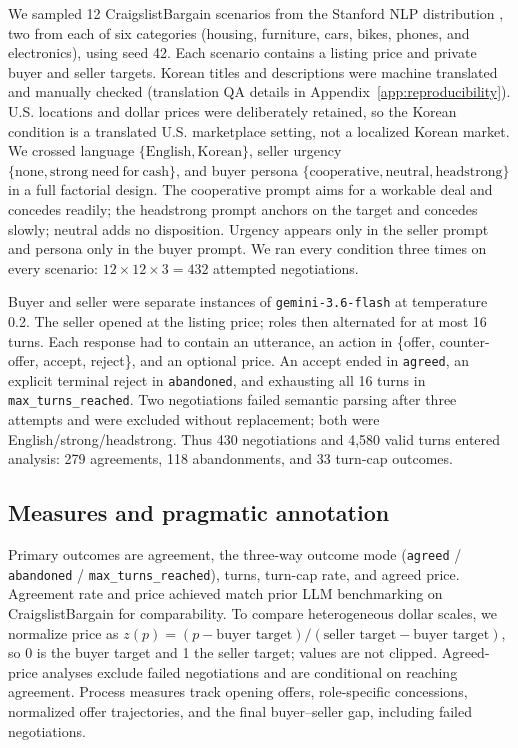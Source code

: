 \documentclass{article}
\begin{document}
We sampled 12 CraigslistBargain scenarios from the Stanford NLP distribution
\citep{he2018decoupling,stanfordnlp2026craigslist}, two from each of six
categories (housing, furniture, cars, bikes, phones, and electronics), using
seed 42. Each scenario contains a listing price and private buyer and seller
targets. Korean titles and descriptions were machine translated and manually checked
(translation QA details in Appendix~\ref{app:reproducibility}). U.S. locations and dollar prices were
deliberately retained, so the Korean condition is a translated U.S.
marketplace setting, not a localized Korean market.
We crossed language $\{\mathrm{English},\mathrm{Korean}\}$,
seller urgency $\{\mathrm{none},\mathrm{strong\ need\ for\ cash}\}$, and buyer
persona $\{\mathrm{cooperative},\mathrm{neutral},\mathrm{headstrong}\}$ in a
full factorial design. The cooperative prompt aims for a workable deal and
concedes readily; the headstrong prompt anchors on the target and concedes
slowly; neutral adds no disposition. Urgency appears only in the seller
prompt and persona only in the buyer prompt. We ran every condition three
times on every scenario: $12\times 12\times 3=432$ attempted negotiations.

Buyer and seller were separate instances of \texttt{gemini-3.6-flash} at temperature 0.2. The seller opened at the listing price;
roles then alternated for at most 16 turns. Each response had to contain an
utterance, an action in \{offer, counter-offer, accept, reject\}, and an
optional price. An accept ended in \texttt{agreed}, an explicit terminal
reject in \texttt{abandoned}, and exhausting all 16 turns in
\texttt{max\_turns\_reached}. Two negotiations failed semantic parsing after three attempts and were
excluded without replacement; both were English/strong/headstrong. Thus 430 negotiations and 4,580 valid turns entered analysis:
279 agreements, 118 abandonments, and 33 turn-cap outcomes.

\subsection{Measures and pragmatic annotation}

Primary outcomes are agreement, the three-way outcome mode
(\texttt{agreed} /  \texttt{abandoned} /  \texttt{max\_turns\_reached}), turns,
turn-cap rate, and agreed price. Agreement rate and price achieved match
prior LLM benchmarking on CraigslistBargain \citep{agreemate2024} for
comparability. To compare heterogeneous dollar scales, we normalize price as
$z(p)=(p-\text{buyer target})/(\text{seller target}-\text{buyer target})$,
so 0 is the buyer target and 1 the seller target; values are not clipped.
Agreed-price analyses exclude failed negotiations and are conditional on
reaching agreement. Process measures track opening offers, role-specific concessions, normalized
offer trajectories, and the final buyer--seller gap, including failed
negotiations.
\end{document}
